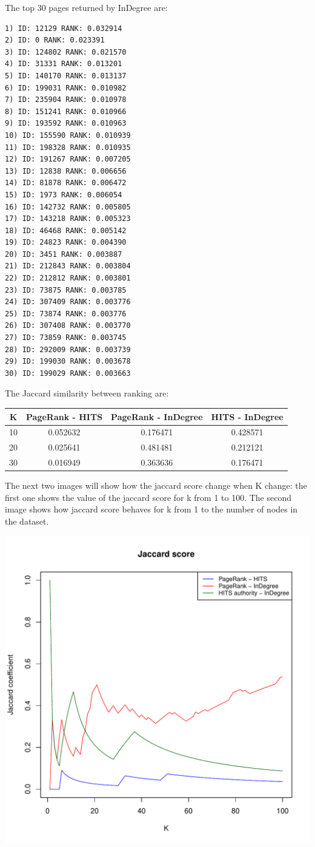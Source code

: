 \documentclass[10pt]{article}
\begin{document}
The top 30 pages returned by InDegree are:
\begin{verbatim}
1) ID: 12129 RANK: 0.032914
2) ID: 0 RANK: 0.023391
3) ID: 124802 RANK: 0.021570
4) ID: 31331 RANK: 0.013201
5) ID: 140170 RANK: 0.013137
6) ID: 199031 RANK: 0.010982
7) ID: 235904 RANK: 0.010978
8) ID: 151241 RANK: 0.010966
9) ID: 193592 RANK: 0.010963
10) ID: 155590 RANK: 0.010939
11) ID: 198328 RANK: 0.010935
12) ID: 191267 RANK: 0.007205
13) ID: 12838 RANK: 0.006656
14) ID: 81878 RANK: 0.006472
15) ID: 1973 RANK: 0.006054
16) ID: 142732 RANK: 0.005805
17) ID: 143218 RANK: 0.005323
18) ID: 46468 RANK: 0.005142
19) ID: 24823 RANK: 0.004390
20) ID: 3451 RANK: 0.003887
21) ID: 212843 RANK: 0.003804
22) ID: 212812 RANK: 0.003801
23) ID: 73875 RANK: 0.003785
24) ID: 307409 RANK: 0.003776
25) ID: 73874 RANK: 0.003776
26) ID: 307408 RANK: 0.003770
27) ID: 73859 RANK: 0.003745
28) ID: 292009 RANK: 0.003739
29) ID: 199030 RANK: 0.003678
30) ID: 199029 RANK: 0.003663
\end{verbatim}

The Jaccard similarity between ranking are:

\begin{tabular}{||c c c c||} 
    \hline
    K & PageRank - HITS & PageRank - InDegree & HITS - InDegree \\ [0.5ex] 
    \hline\hline
    10 & 0.052632 & 0.176471 & 0.428571 \\
    20 & 0.025641 & 0.481481 & 0.212121 \\
    30 & 0.016949 & 0.363636 & 0.176471 \\ [1ex] 
    \hline
\end{tabular}

The next two images will show how the jaccard score change when K change: the first one shows the value of the jaccard score for k from 1 to 100. The second image shows how jaccard score behaves for k from 1 to the number of nodes in the dataset.

\includegraphics[scale=0.8]{img/jaccard-100.pdf}
\end{document}
